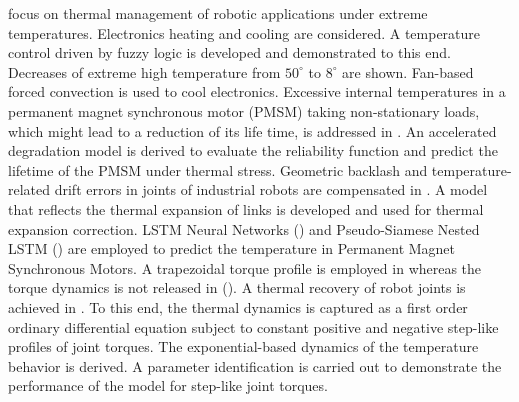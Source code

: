 \documentclass{ifacconf}
\begin{document}
\cite{afaq2023intelligent} focus on thermal management of robotic applications under extreme temperatures. Electronics heating and cooling are considered. A temperature control driven by fuzzy logic is developed and demonstrated to this end. Decreases of extreme high temperature from $50^{\circ}$ to $8^{\circ}$ are shown. Fan-based forced convection is used to cool electronics. Excessive internal temperatures in a permanent magnet synchronous motor (PMSM)  taking non-stationary loads, which might lead to a reduction of its life time, is addressed in \cite{chen2024lifetime}. An accelerated degradation model is derived to evaluate the reliability function and predict the lifetime of the PMSM under thermal stress.  Geometric backlash and temperature-related drift errors in joints of industrial robots are compensated in \cite{sigron2023compensation}. A model that reflects the thermal expansion of links is developed and used for thermal expansion correction.  LSTM Neural
Networks (\cite{he2024rotor})  and   Pseudo-Siamese Nested LSTM (\cite{cai2021temperature}) are employed to predict the temperature in Permanent Magnet Synchronous Motors. A trapezoidal torque profile is employed in \cite{he2024rotor} whereas the torque dynamics is not released in (\cite{cai2021temperature}). A thermal recovery of robot joints is achieved in  \cite{jorgensen2019thermal}. To this end, the thermal dynamics is captured as a first order ordinary differential equation subject to constant positive and negative step-like profiles of joint torques. The exponential-based dynamics of the temperature behavior is derived.  A parameter identification is carried out to demonstrate the performance of the model for step-like joint torques. %
\end{document}

